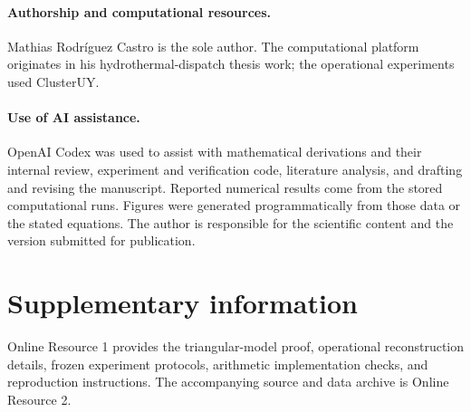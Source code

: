 \documentclass[11pt]{article}
\theoremstyle{definition}
\theoremstyle{remark}
\begin{document}
\paragraph{Authorship and computational resources.}
Mathias Rodr\'iguez Castro is the sole author. The computational platform originates
in his hydrothermal-dispatch thesis work; the operational experiments used ClusterUY.
\paragraph{Use of AI assistance.}
OpenAI Codex was used to assist with mathematical derivations and their internal
review, experiment and verification code, literature analysis, and drafting and revising
the manuscript. Reported numerical results come from the stored computational runs.
Figures were generated programmatically from those data or the stated equations.
The author is responsible for the scientific content and the version submitted for
publication.

\section*{Supplementary information}
Online Resource 1 provides the triangular-model proof, operational reconstruction
details, frozen experiment protocols, arithmetic implementation checks, and reproduction
instructions. The accompanying source and data archive is Online Resource 2.



\end{document}
